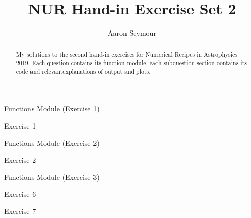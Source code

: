 \documentclass[a4paper,10pt]{article}
\title{NUR Hand-in Exercise Set 2}
\author{Aaron Seymour}
\begin{document}
\maketitle

\begin{abstract}
 My solutions to the second hand-in exercises for Numerical Recipes in Astrophysics 2019. Each question contains its function module, each subquestion section contains its code and relevantexplanations of output and plots.
\end{abstract}


\begin{section*}{Functions Module (Exercise 1)}

\end{section*}

\begin{section}{Exercise 1}

\end{section}


\FloatBarrier
\begin{section*}{Functions Module (Exercise 2)}

\end{section*}

\begin{section}{Exercise 2}

\end{section}


\FloatBarrier
\begin{section*}{Functions Module (Exercise 3)}

\end{section*}



\begin{section}{Exercise 6}

\end{section}


\FloatBarrier
\begin{section}{Exercise 7}

\end{section}
  
\end{document}
